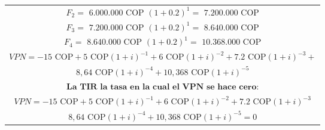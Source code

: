 \begin{center}
\begin{longtable}{|c|c|c|}
        \multicolumn{3}{|c|}{$F_2 = $ $6\text{.}000\text{.}000 \text{ COP}$  $(1 + 0.2)^{1} = $ $7\text{.}200\text{.}000 \text{ COP}$ }                                                                                               \\
        \multicolumn{3}{|c|}{$F_3 = $ $7\text{.}200\text{.}000 \text{ COP}$  $(1 + 0.2)^{1} = $ $8\text{.}640\text{.}000 \text{ COP}$ }                                                                                               \\
        \multicolumn{3}{|c|}{$F_4 = $ $8\text{.}640\text{.}000 \text{ COP}$  $(1 + 0.2)^{1} = $ $10\text{.}368\text{.}000 \text{ COP}$ }                                                                                              \\
        \multicolumn{3}{|c|}{ $ VPN = -15\text{ COP} + 5\text{ COP}(1+i)^{-1} + 6\text{ COP}(1+i)^{-2} + 7.2\text{ COP}(1+i)^{-3} +$  }                                                                                               \\
        \multicolumn{3}{|c|}{$ 8,64\text{ COP}(1+i)^{-4} + 10,368\text{ COP}(1+i)^{-5}$}                                                                                                                                              \\
        \multicolumn{3}{|c|}{$\textbf{La TIR la tasa en la cual el VPN se hace cero:}  $}                                                                                                                                             \\

        \multicolumn{3}{|c|}{$ VPN = -15\text{ COP} + 5\text{ COP}(1+i)^{-1} + 6\text{ COP}(1+i)^{-2} + 7.2\text{ COP}(1+i)^{-3}$}                                                                                                    \\
        \multicolumn{3}{|c|}{$8,64\text{ COP}(1+i)^{-4} + 10,368\text{ COP}(1+i)^{-5} = 0$}                                                                                                                                           \\


\end{longtable}
\end{center}
